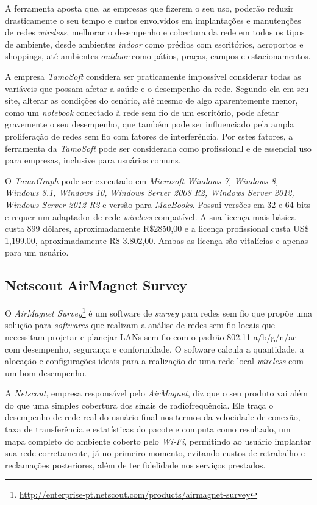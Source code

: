 \documentclass[
	12pt,				%
	twoside,			%
	a4paper,			%
	english,			%
	french,				%
	spanish,			%
	brazil				%
	]{abntex2}
\begin{document}
A ferramenta aposta que, as empresas que fizerem o seu uso, poderão
reduzir drasticamente o seu tempo e custos envolvidos em implantações e
manutenções de redes \emph{wireless}, melhorar o desempenho e cobertura
da rede em todos os tipos de ambiente, desde ambientes \emph{indoor}
como prédios com escritórios, aeroportos e shoppings, até ambientes
\emph{outdoor} como pátios, praças, campos e estacionamentos.

A empresa \emph{TamoSoft} considera ser praticamente impossível
considerar todas as variáveis que possam afetar a saúde e o desempenho
da rede. Segundo ela em seu site, alterar as condições do cenário, até
mesmo de algo aparentemente menor, como um \emph{notebook} conectado à
rede sem fio de um escritório, pode afetar gravemente o seu desempenho,
que também pode ser influenciado pela ampla proliferação de redes sem
fio com fatores de interferência. Por estes fatores, a ferramenta da
\emph{TamoSoft} pode ser considerada como profissional e de essencial
uso para empresas, inclusive para usuários comuns.

O \emph{TamoGraph} pode ser executado em \emph{Microsoft Windows 7,
Windows 8, Windows 8.1, Windows 10, Windows Server 2008 R2, Windows
Server 2012, Windows Server 2012 R2} e versão para \emph{MacBooks}.
Possui versões em 32 e 64 bits e requer um adaptador de rede
\emph{wireless} compatível. A sua licença mais básica custa 899 dólares,
aproximadamente R\$2850,00 e a licença profissional custa US\$ 1,199.00,
aproximadamente R\$ 3.802,00. Ambas as licença são vitalícias e apenas
para um usuário.

\subsection{Netscout AirMagnet Survey}\label{netscout-airmagnet-survey}

O \emph{AirMagnet Survey}\footnote{\url{http://enterprise-pt.netscout.com/products/airmagnet-survey}}
é um software de \emph{survey} para redes sem fio que propõe uma solução
para \emph{softwares} que realizam a análise de redes sem fio locais que
necessitam projetar e planejar LANs sem fio com o padrão 802.11
a/b/g/n/ac com desempenho, segurança e conformidade. O software calcula
a quantidade, a alocação e configurações ideais para a realização de uma
rede local \emph{wireless} com um bom desempenho.

A \emph{Netscout}, empresa responsável pelo \emph{AirMagnet}, diz que o
seu produto vai além do que uma simples cobertura dos sinais de
radiofrequência. Ele traça o desempenho de rede real do usuário final
nos termos da velocidade de conexão, taxa de transferência e
estatísticas do pacote e computa como resultado, um mapa completo do
ambiente coberto pelo \emph{Wi-Fi}, permitindo ao usuário implantar sua
rede corretamente, já no primeiro momento, evitando custos de retrabalho
e reclamações posteriores, além de ter fidelidade nos serviços
prestados.
\end{document}
